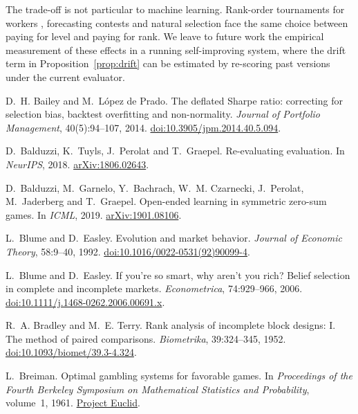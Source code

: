 \documentclass[11pt]{article}
\theoremstyle{definition}
\theoremstyle{remark}
\begin{document}
The trade-off is not particular to machine learning. Rank-order tournaments for workers
\citep{lazear1981tournaments}, forecasting contests and natural selection face the same
choice between paying for level and paying for rank. We leave to future work the empirical
measurement of these effects in a running self-improving system, where the drift term in
Proposition~\ref{prop:drift} can be estimated by re-scoring past versions under the current
evaluator.

\begin{thebibliography}{}\small

D.~H. Bailey and M.~L\'opez de Prado. The deflated Sharpe ratio: correcting for selection bias,
backtest overfitting and non-normality. \emph{Journal of Portfolio Management}, 40(5):94--107,
2014. \href{https://doi.org/10.3905/jpm.2014.40.5.094}{doi:10.3905/jpm.2014.40.5.094}.

D.~Balduzzi, K.~Tuyls, J.~Perolat and T.~Graepel. Re-evaluating evaluation. In \emph{NeurIPS},
2018. \href{https://arxiv.org/abs/1806.02643}{arXiv:1806.02643}.

D.~Balduzzi, M.~Garnelo, Y.~Bachrach, W.~M. Czarnecki, J.~Perolat, M.~Jaderberg and T.~Graepel.
Open-ended learning in symmetric zero-sum games. In \emph{ICML}, 2019.
\href{https://arxiv.org/abs/1901.08106}{arXiv:1901.08106}.

L.~Blume and D.~Easley. Evolution and market behavior. \emph{Journal of Economic Theory},
58:9--40, 1992. \href{https://doi.org/10.1016/0022-0531(92)90099-4}{doi:10.1016/0022-0531(92)90099-4}.

L.~Blume and D.~Easley. If you're so smart, why aren't you rich? Belief selection in complete
and incomplete markets. \emph{Econometrica}, 74:929--966, 2006.
\href{https://doi.org/10.1111/j.1468-0262.2006.00691.x}{doi:10.1111/j.1468-0262.2006.00691.x}.

R.~A. Bradley and M.~E. Terry. Rank analysis of incomplete block designs: I. The method of
paired comparisons. \emph{Biometrika}, 39:324--345, 1952.
\href{https://doi.org/10.1093/biomet/39.3-4.324}{doi:10.1093/biomet/39.3-4.324}.

L.~Breiman. Optimal gambling systems for favorable games. In \emph{Proceedings of the Fourth
Berkeley Symposium on Mathematical Statistics and Probability}, volume~1, 1961.
\href{https://projecteuclid.org/proceedings/berkeley-symposium-on-mathematical-statistics-and-probability/Proceedings-of-the-Fourth-Berkeley-Symposium-on-Mathematical-Statistics-and/Chapter/Optimal-gambling-systems-for-favorable-games/bsmsp/1200512159}{Project Euclid}.


\end{thebibliography}
\end{document}
